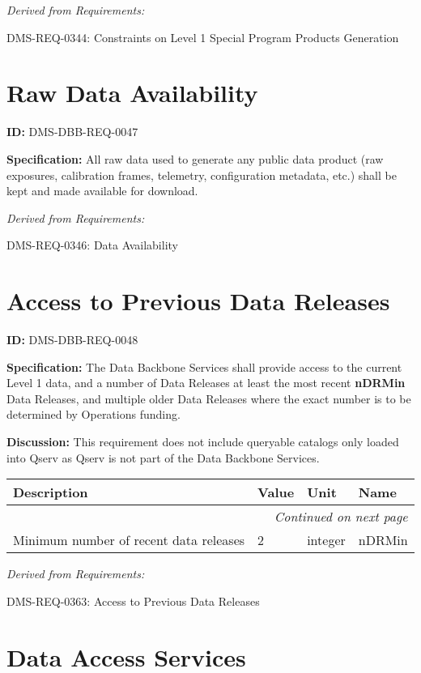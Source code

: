 \documentclass[SE,toc,lsstdraft]{lsstdoc}
\makeatletter
\newcommand{\paramname}[1]{\hspace{0pt}#1}
\newcommand{\unitname}[1]{\hspace{0pt}#1}
\newenvironment{parameters}[0]{%
\setlength\LTleft{0pt}
\setlength\LTright{\fill}
\begin{small}
\begin{longtable}[]{|p{0.49\textwidth}|l|p{0.6in}|p{1.70in}@{}|}

\hline \textbf{Description} & \textbf{Value} & \textbf{Unit} & \textbf{Name} \\ \hline
\endhead

\hline \multicolumn{4}{r}{\emph{Continued on next page}} \\
\endfoot

\hline\hline
\endlastfoot
}{%
\hline
\end{longtable}
\end{small}
}
\makeatother
\begin{document}
\emph{Derived from Requirements:}

DMS-REQ-0344:
Constraints on Level 1 Special Program Products Generation \newline

\section{Raw Data Availability}

\label{DMS-DBB-REQ-0047}
\textbf{ID:} DMS-DBB-REQ-0047

\textbf{Specification:}
All raw data used to generate any public data product (raw exposures, calibration
frames, telemetry, configuration metadata, etc.) shall be kept and made available for
download.

\emph{Derived from Requirements:}

DMS-REQ-0346:
Data Availability \newline

\section{Access to Previous Data Releases}

\label{DMS-DBB-REQ-0048}
\textbf{ID:} DMS-DBB-REQ-0048

\textbf{Specification:}
The Data Backbone Services shall provide access to the current Level 1 data, and a number of Data Releases at least the most recent \textbf{nDRMin} Data Releases, and multiple older Data Releases where the exact number is to be determined by Operations funding.

\textbf{Discussion:}
This requirement does not include queryable catalogs only loaded into Qserv as Qserv is not part of the Data Backbone Services.

\begin{parameters}
Minimum number of recent data releases
&
2
&
\unitname{%
integer
}
&
\paramname{%
nDRMin
} \\\hline
\end{parameters}

\emph{Derived from Requirements:}

DMS-REQ-0363:
Access to Previous Data Releases \newline

\section{Data Access Services}
\end{document}
